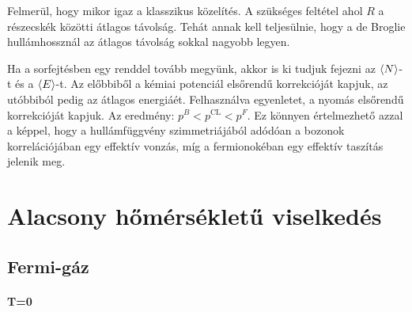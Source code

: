   Felmerül, hogy mikor igaz a klasszikus közelítés. A szükséges feltétel
  ahol $R$ a részecskék közötti átlagos távolság. Tehát annak kell teljesülnie, hogy a de Broglie hullámhossznál az átlagos távolság sokkal nagyobb legyen.
  
  Ha a sorfejtésben egy renddel tovább megyünk, akkor is ki tudjuk fejezni az $\left\langle N\right\rangle$-t és a $\left\langle E\right\rangle$-t. Az előbbiből a kémiai potenciál elsőrendű korrekcióját kapjuk, az utóbbiból pedig az átlagos energiáét. Felhasználva  egyenletet, a nyomás elsőrendű korrekcióját kapjuk. Az eredmény: $p^B<p^{\text{CL}}<p^F$. Ez könnyen értelmezhető azzal a képpel, hogy a hullámfüggvény szimmetriájából adódóan a bozonok korrelációjában egy effektív vonzás, míg a fermionokéban egy effektív taszítás jelenik meg. 
  
  
 \section{Alacsony hőmérsékletű viselkedés}
  
  \subsection{Fermi-gáz}
  
   \paragraph{T=0}
    
